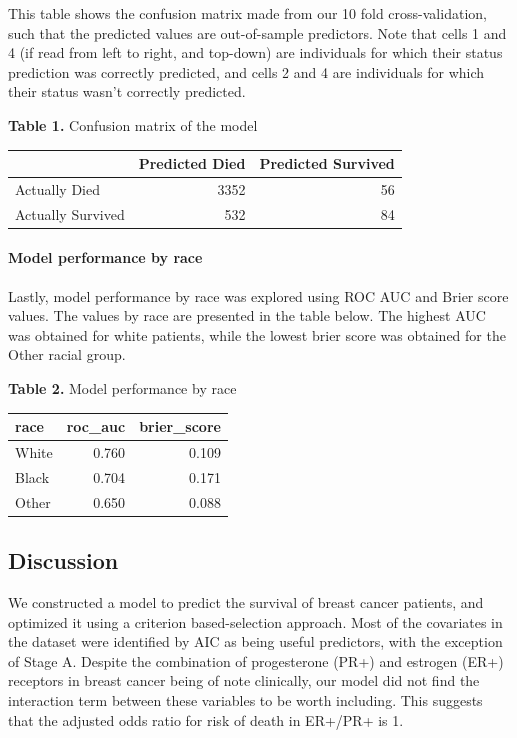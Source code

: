 \documentclass[
]{article}
\begin{document}
This table shows the confusion matrix made from our 10 fold
cross-validation, such that the predicted values are out-of-sample
predictors. Note that cells 1 and 4 (if read from left to right, and
top-down) are individuals for which their status prediction was
correctly predicted, and cells 2 and 4 are individuals for which their
status wasn't correctly predicted.

\textbf{Table 1.} Confusion matrix of the model

\begin{longtable}[]{@{}lrr@{}}
\toprule\noalign{}
& Predicted Died & Predicted Survived \\
\midrule\noalign{}
\endhead
\bottomrule\noalign{}
\endlastfoot
Actually Died & 3352 & 56 \\
Actually Survived & 532 & 84 \\
\end{longtable}

\hypertarget{model-performance-by-race}{%
\paragraph{Model performance by race}\label{model-performance-by-race}}

Lastly, model performance by race was explored using ROC AUC and Brier
score values. The values by race are presented in the table below. The
highest AUC was obtained for white patients, while the lowest brier
score was obtained for the Other racial group.

\textbf{Table 2.} Model performance by race

\begin{longtable}[]{@{}lrr@{}}
\toprule\noalign{}
race & roc\_auc & brier\_score \\
\midrule\noalign{}
\endhead
\bottomrule\noalign{}
\endlastfoot
White & 0.760 & 0.109 \\
Black & 0.704 & 0.171 \\
Other & 0.650 & 0.088 \\
\end{longtable}

\hypertarget{discussion}{%
\subsection{Discussion}\label{discussion}}

We constructed a model to predict the survival of breast cancer
patients, and optimized it using a criterion based-selection approach.
Most of the covariates in the dataset were identified by AIC as being
useful predictors, with the exception of Stage A. Despite the
combination of progesterone (PR+) and estrogen (ER+) receptors in breast
cancer being of note clinically, our model did not find the interaction
term between these variables to be worth including. This suggests that
the adjusted odds ratio for risk of death in ER+/PR+ is 1.
\end{document}

